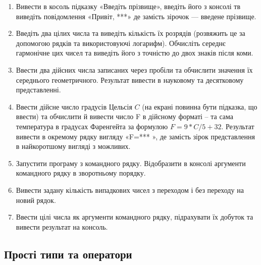 \documentclass[]{article}
\begin{document}
\begin{enumerate}
\def\labelenumi{2.\arabic{enumi}.}
\item
Вивести в косоль підказку «Введіть прізвище», введіть його з консолі тв виведіть повідомлення «Привіт, ***» де замість зірочок — введене прізвище.
\item
 Введіть два цілих числа та виведіть кількість їх розрядів (розвяжить це за допомогою рядків та використовуючі логарифм). Обчисліть середнє гармонічне цих чисел та виведіть його з точністю до двох знаків після коми.

\item Ввести два дійсних числа записаних через пробіли та обчислити значення їх середнього геометричного. Результат вивести в науковому та десятковому представленні. 

\item Ввести дійсне число градусів Цельсія $C$ (на екрані повинна бути підказка, що ввести) та обчислити й вивести число F в дійсному форматі – та сама температура в градусах Фаренгейта за формулою $F=9*C/5+32$. Результат вивести в окремому рядку вигляду «F=*** », де замість зірок представлення в найкоротшому вигляді з можливих.

\item Запустити програму з командного рядку. Відобразити в консолі аргументи командного рядку в зворотньому порядку.

\item Вивести задану кількість випадкових чисел з переходом і без переходу на новий рядок.

\item Ввести цілі числа як аргументи командного рядку, підрахувати їх добуток та вивести результат на консоль.

\end{enumerate}

\subsection{Прості типи та оператори}
\end{document}
